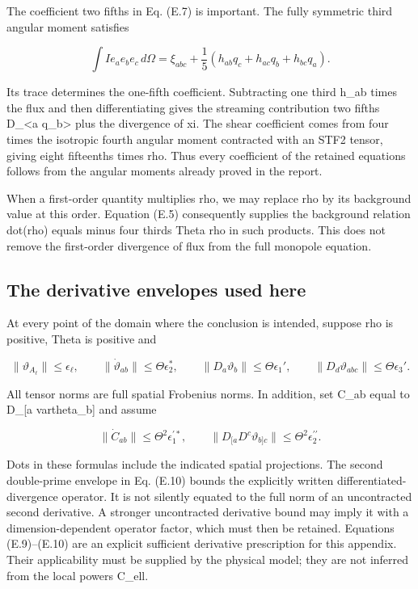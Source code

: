 \documentclass[
  11pt,
  a4paper]{article}
\begin{document}
The coefficient two fifths in Eq. (E.7) is important. The fully symmetric third angular moment satisfies

\[
\int I e_a e_b e_c\,d\Omega
=\xi_{abc}+\frac15(h_{ab}q_c+h_{ac}q_b+h_{bc}q_a).
\tag{E.8}
\]

Its trace determines the one-fifth coefficient. Subtracting one third h\_ab times the flux and then differentiating gives the streaming contribution two fifths D\_\textless a q\_b\textgreater{} plus the divergence of xi. The shear coefficient comes from four times the isotropic fourth angular moment contracted with an STF2 tensor, giving eight fifteenths times rho. Thus every coefficient of the retained equations follows from the angular moments already proved in the report.

When a first-order quantity multiplies rho, we may replace rho by its background value at this order. Equation (E.5) consequently supplies the background relation dot(rho) equals minus four thirds Theta rho in such products. This does not remove the first-order divergence of flux from the full monopole equation.

\hypertarget{e.4-the-derivative-envelopes-used-here}{%
\subsection{The derivative envelopes used here}\label{e.4-the-derivative-envelopes-used-here}}

At every point of the domain where the conclusion is intended, suppose rho is positive, Theta is positive and

\[
\|\vartheta_{A_\ell}\|\le\epsilon_\ell,\qquad
\|\dot\vartheta_{ab}\|\le\Theta\epsilon_2^*,\qquad
\|D_a\vartheta_b\|\le\Theta\epsilon_1',\qquad
\|D_d\vartheta_{abc}\|\le\Theta\epsilon_3'.
\tag{E.9}
\]

All tensor norms are full spatial Frobenius norms. In addition, set C\_ab equal to D\_{[}a vartheta\_b{]} and assume

\[
\|\dot C_{ab}\|\le\Theta^2\epsilon_1^{\prime *},
\qquad
\|D_{[a}D^c\vartheta_{b]c}\|
\le\Theta^2\epsilon_2^{\prime\prime}.
\tag{E.10}
\]

Dots in these formulas include the indicated spatial projections. The second double-prime envelope in Eq. (E.10) bounds the explicitly written differentiated-divergence operator. It is not silently equated to the full norm of an uncontracted second derivative. A stronger uncontracted derivative bound may imply it with a dimension-dependent operator factor, which must then be retained. Equations (E.9)--(E.10) are an explicit sufficient derivative prescription for this appendix. Their applicability must be supplied by the physical model; they are not inferred from the local powers C\_ell.
\end{document}
